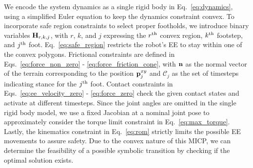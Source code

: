 \documentclass[letterpaper, 10 pt, conference]{ieeeconf}
\begin{document}
We encode the system dynamics as a single rigid body in Eq.~\ref{eq:dynamics},
using a simplified Euler equation to keep the dynamics constraint convex. To incorporate safe region constraints to select proper footholds, we introduce binary variables $\mathbf{H}_{r,k,j}$, with $r$, $k$, and $j$ expressing the $r^{\rm th}$ convex region, $k^{\rm th}$ footstep, and $j^{\rm th}$ foot. 
Eq.~\ref{eq:safe_region} restricts
the robot's EE to stay within one of the convex polygons. 
Frictional constraints are defined in Eqs.~\ref{eq:force_non_zero} - \ref{eq:force_friction_cone}, with $\mathbf{n}$ as the normal vector of the terrain corresponding to the position $\mathbf{p}^{xy}_j$ and $\mathcal{C}_j$ as the set of timesteps indicating stance for the $j^{\rm th}$ foot. Contact constraints in Eqs.~\ref{eq:ee_velocity_zero} - \ref{eq:force_zero} check the given contact states and activate at different timesteps.
Since the joint angles are omitted in the single rigid body model, we use a fixed Jacobian at a nominal joint pose to approximately consider the torque limit constraint in Eq.~\ref{eq:max_torque}. 
Lastly, the kinematics constraint in Eq.~\ref{eq:rom} strictly limits the possible EE movements to assure safety.
Due to the convex nature of this MICP, we can determine the feasibility of a possible symbolic transition by checking if the optimal solution exists.
\end{document}
